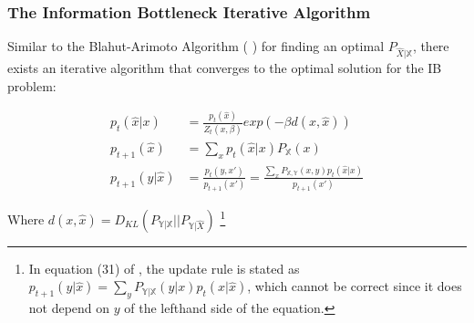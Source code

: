 \begin{frame}
    \frametitle{The Information Bottleneck Iterative Algorithm}
    Similar to the Blahut-Arimoto Algorithm (\cite{blahut_computation_1972} \cite{arimoto_algorithm_1972}) for finding an optimal $P_{\hat{X}|\mathbb{X}}$, there exists an iterative algorithm that converges to the optimal solution for the IB problem:

    \begin{align*}
        p_t(\hat{x}|x) &= \frac{p_t(\hat{x})}{Z_t(x, \beta)} exp(- \beta d(x, \hat{x}) ) \\
        p_{t+1}(\hat{x}) &= \sum_{x} p_t(\hat{x}|x) P_{\mathbb{X}}(x) \\
        p_{t+1}(y|\hat{x}) &= \frac{p_t(y, x')}{p_{t+1}(x')} = \frac{\sum_{x} P_{\mathbb{X},\mathbb{Y}}(x, y) p_t(\hat{x}|x)}{p_{t+1}(x')} 
    \end{align*} 

    Where $d(x, \hat{x}) = D_{KL}(P_{\mathbb{Y}|\mathbb{X}}|| P_{\mathbb{Y}|\hat{X}})$ \footnote{
        In equation (31) of \cite{tishby_information_2000}, the update rule is stated as $p_{t+1}(y|\hat{x}) = \sum_y P_{\mathbb{Y}|\mathbb{X}}(y|x) p_t(x|\hat{x})$, which cannot be correct since it does not depend on $y$ of the lefthand side of the equation.
    }
    
\end{frame}
